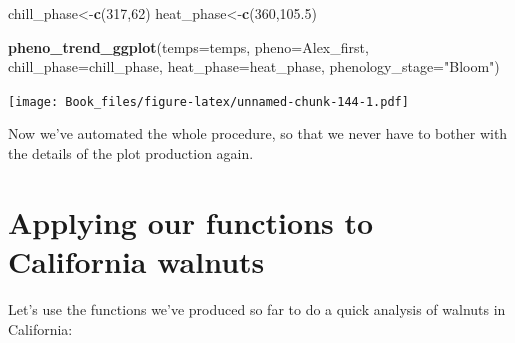 \documentclass[
]{book}
\newenvironment{Shaded}{\begin{snugshade}}{\end{snugshade}}
\newcommand{\DataTypeTok}[1]{\textcolor[rgb]{0.13,0.29,0.53}{#1}}
\newcommand{\DecValTok}[1]{\textcolor[rgb]{0.00,0.00,0.81}{#1}}
\newcommand{\FloatTok}[1]{\textcolor[rgb]{0.00,0.00,0.81}{#1}}
\newcommand{\KeywordTok}[1]{\textcolor[rgb]{0.13,0.29,0.53}{\textbf{#1}}}
\newcommand{\NormalTok}[1]{#1}
\newcommand{\StringTok}[1]{\textcolor[rgb]{0.31,0.60,0.02}{#1}}
\begin{document}
\begin{Shaded}
\begin{Highlighting}[]
\NormalTok{chill_phase<-}\KeywordTok{c}\NormalTok{(}\DecValTok{317}\NormalTok{,}\DecValTok{62}\NormalTok{)}
\NormalTok{heat_phase<-}\KeywordTok{c}\NormalTok{(}\DecValTok{360}\NormalTok{,}\FloatTok{105.5}\NormalTok{)}

\KeywordTok{pheno_trend_ggplot}\NormalTok{(}\DataTypeTok{temps=}\NormalTok{temps,}
                   \DataTypeTok{pheno=}\NormalTok{Alex_first,}
                   \DataTypeTok{chill_phase=}\NormalTok{chill_phase,}
                   \DataTypeTok{heat_phase=}\NormalTok{heat_phase,}
                   \DataTypeTok{phenology_stage=}\StringTok{"Bloom"}\NormalTok{)}
\end{Highlighting}
\end{Shaded}

\texttt{[image: Book\_files/figure-latex/unnamed-chunk-144-1.pdf]}

Now we've automated the whole procedure, so that we never have to bother with the details of the plot production again.

\hypertarget{applying-our-functions-to-california-walnuts}{%
\section{Applying our functions to California walnuts}\label{applying-our-functions-to-california-walnuts}}

Let's use the functions we've produced so far to do a quick analysis of walnuts in California:
\end{document}
